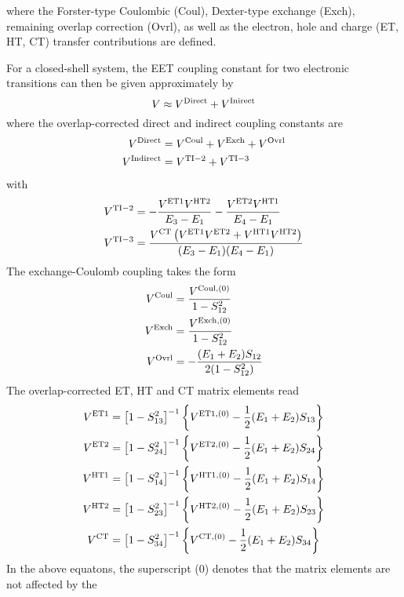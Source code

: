 %
where the Forster-type Coulombic (Coul), Dexter-type exchange (Exch), remaining overlap correction (Ovrl),
as well
as the electron, hole and charge (ET, HT, CT) transfer contributions are defined.

For a closed-shell system, the EET coupling constant for two electronic transitions
can then be given approximately by
%
\begin{equation}
  V \approx V^{\rm Direct} + V^{\rm Inirect}
\end{equation}
%
where the overlap\hyp{}corrected direct and indirect coupling constants are 
%
\begin{align}
  V^{\rm Direct  } &= V^{\rm Coul} + V^{\rm Exch} + V^{\rm Ovrl} \\
  V^{\rm Indirect} &= V^{\rm TI-2} + V^{\rm TI-3}
\end{align}
%
with
%
\begin{align}
 V^{\rm TI-2} &=-\frac{V^{\rm ET1} V^{\rm HT2}}{E_3-E_1} -\frac{V^{\rm ET2} V^{\rm HT1}}{E_4-E_1} \\
 V^{\rm TI-3} &= \frac{V^{\rm CT} \left( V^{\rm ET1} V^{\rm ET2} + V^{\rm HT1} V^{\rm HT2}\right) }{(E_3-E_1)(E_4-E_1)}
\end{align}
%
The exchange-Coulomb coupling takes the form
%
\begin{align}
 V^{\rm Coul} &= \frac{V^{{\rm Coul},(0)}}{1 - S_{12}^2} \\
 V^{\rm Exch} &= \frac{V^{{\rm Exch},(0)}}{1 - S_{12}^2} \\
 V^{\rm Ovrl} &=-\frac{(E_1+E_2)S_{12}}{2(1-S_{12}^2)}
\end{align}
%
The overlap-corrected ET, HT and CT matrix elements read
%
\begin{align}
 V^{\rm ET1} &= \left[ 1 - S_{13}^2 \right]^{-1} \left\{ V^{{\rm ET1},(0)} - \frac{1}{2} (E_1+E_2) S_{13} \right\} \\
 V^{\rm ET2} &= \left[ 1 - S_{24}^2 \right]^{-1} \left\{ V^{{\rm ET2},(0)} - \frac{1}{2} (E_1+E_2) S_{24} \right\} \\
 V^{\rm HT1} &= \left[ 1 - S_{14}^2 \right]^{-1} \left\{ V^{{\rm HT1},(0)} - \frac{1}{2} (E_1+E_2) S_{14} \right\} \\
 V^{\rm HT2} &= \left[ 1 - S_{23}^2 \right]^{-1} \left\{ V^{{\rm HT2},(0)} - \frac{1}{2} (E_1+E_2) S_{23} \right\} \\
 V^{\rm CT } &= \left[ 1 - S_{34}^2 \right]^{-1} \left\{ V^{{\rm CT },(0)} - \frac{1}{2} (E_1+E_2) S_{34} \right\} 
\end{align}
%
In the above equatons, the superscript (0) denotes that the matrix elements are not affected by the
